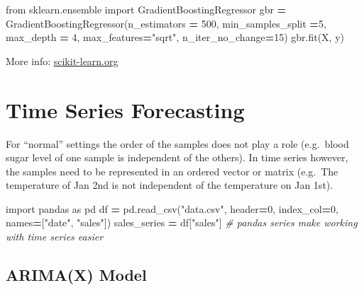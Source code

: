 \documentclass[
]{book}
\newenvironment{Shaded}{\begin{snugshade}}{\end{snugshade}}
\newcommand{\CommentTok}[1]{\textcolor[rgb]{0.56,0.35,0.01}{\textit{#1}}}
\newcommand{\DecValTok}[1]{\textcolor[rgb]{0.00,0.00,0.81}{#1}}
\newcommand{\ImportTok}[1]{#1}
\newcommand{\NormalTok}[1]{#1}
\newcommand{\OperatorTok}[1]{\textcolor[rgb]{0.81,0.36,0.00}{\textbf{#1}}}
\newcommand{\StringTok}[1]{\textcolor[rgb]{0.31,0.60,0.02}{#1}}
\begin{document}
\begin{Shaded}
\begin{Highlighting}[]
\ImportTok{from}\NormalTok{ sklearn.ensemble }\ImportTok{import}\NormalTok{ GradientBoostingRegressor}
\NormalTok{gbr }\OperatorTok{=}\NormalTok{ GradientBoostingRegressor(n\_estimators }\OperatorTok{=} \DecValTok{500}\NormalTok{, min\_samples\_split }\OperatorTok{=}\DecValTok{5}\NormalTok{, max\_depth }\OperatorTok{=} \DecValTok{4}\NormalTok{, max\_features}\OperatorTok{=}\StringTok{"sqrt"}\NormalTok{, n\_iter\_no\_change}\OperatorTok{=}\DecValTok{15}\NormalTok{)}
\NormalTok{gbr.fit(X, y)}
\end{Highlighting}
\end{Shaded}

More info:
\href{https://scikit-learn.org/stable/modules/generated/sklearn.ensemble.GradientBoostingRegressor.html}{scikit-learn.org}\\

\hypertarget{time-series-forecasting}{%
\section{Time Series Forecasting}\label{time-series-forecasting}}

For ``normal'' settings the order of the samples does not play a role
(e.g.~blood sugar level of one sample is independent of the others). In
time series however, the samples need to be represented in an ordered
vector or matrix (e.g.~The temperature of Jan 2nd is not independent of
the temperature on Jan 1st).

\begin{Shaded}
\begin{Highlighting}[]
\ImportTok{import}\NormalTok{ pandas }\ImportTok{as}\NormalTok{ pd}
\NormalTok{df }\OperatorTok{=}\NormalTok{ pd.read\_csv(}\StringTok{"data.csv"}\NormalTok{, header}\OperatorTok{=}\DecValTok{0}\NormalTok{, index\_col}\OperatorTok{=}\DecValTok{0}\NormalTok{, names}\OperatorTok{=}\NormalTok{[}\StringTok{"date"}\NormalTok{, }\StringTok{"sales"}\NormalTok{])}
\NormalTok{sales\_series }\OperatorTok{=}\NormalTok{ df[}\StringTok{"sales"}\NormalTok{] }\CommentTok{\# pandas series make working with time series easier }
\end{Highlighting}
\end{Shaded}

\hypertarget{arimax-model}{%
\subsection{ARIMA(X) Model}\label{arimax-model}}
\end{document}
